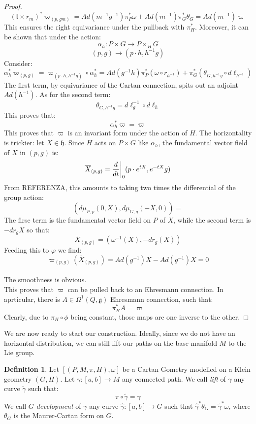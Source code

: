 \documentclass[12pt,a4paper]{report}
\theoremstyle{definition}
\newtheorem{Def}{Definition}[chapter]
\theoremstyle{Theorem}
\theoremstyle{definition}
\theoremstyle{definition}
\begin{document}
\begin{proof}
		$$(\mathbb{I}\times r_m)^*\varpi_{(p,gm)}=Ad(m^{-1}g^{-1})\pi_P^*\omega+Ad(m^{-1})\pi_G^*\theta_{G}=Ad(m^{-1})\varpi$$
		This ensures the right equivariance under the pullback with $\pi_H^*$. Moreover, it can be shown that under the action:
		$$\alpha_h:P\times G\rightarrow P\times_H G$$
		$$(p,g)\rightarrow (p\cdot h, h^{-1}g)$$
		Consider:
		$$\alpha_h^*\varpi_{(p,g)}=\varpi_{(p\cdot h,h^{-1}g)}\circ \alpha^*_h=Ad(g^{-1}h)\pi_P^*({\omega\circ r_{h^{-1}}})+\pi_G^*(\theta_{G,h^{-1}g}\circ d\ell_{h^{-1}})$$
		The first term, by equivariance of the Cartan connection, spits out an adjoint $Ad(h^{-1})$. As for the second term:
		$$\theta_{G,h^{-1}g}=d\ell_g^{-1}\circ d\ell_{h}$$
		This proves that:
		$$\alpha_h^*\varpi=\varpi$$
		This proves that $\varpi$ is an invariant form under the action of $H$. The horizontality is trickier: let $X\in \mathfrak{h}$. Since $H$ acts on $P\times G$ like $\alpha_h$, the fundamental vector field of $X$ in $(p,g)$ is:
		$$\overline{X}_{(p,g)}={d\over dt}\bigg|_0 (p\cdot e^{tX},e^{-tX}g)$$ From REFERENZA, this amounts to taking two times the differential of the group action:
		$$(d\mu_{P,p}(0,X),d\mu_{G,g}(-X,0))=$$
		The firse term is the fundamental vector field on $P$ of $X$, while the second term is $-dr_gX$ so that:
		$$\overline{X}_{(p,g)}=(\omega^{-1}(X),-dr_g(X))$$
		Feeding this to $\varphi$ we find:
		$$\varpi_{(p,g)}(\overline{X}_{(p,g)})=Ad(g^{-1})X-Ad(g^{-1})X=0$$
		\\
		The smoothness is obvious.\\ This proves that $\varpi$ can be pulled back to an Ehresmann connection. In aprticular, there is $A\in\Omega^1(Q,\mathfrak{g})$ Ehresmann connection, such that:
		$$\pi^*_HA=\varpi$$ 
		Clearly, due to $\pi_H\circ \phi$ being constant, those maps are one inverse to the other.
	\end{proof}
	We are now ready to start our construction. Ideally, since we do not have an horizontal distribution, we can still lift our paths on the base manifold $M$ to the Lie group. 
	\begin{Def}
		Let $[(P,M,\pi,H),\omega]$ be a Cartan Gometry modelled on a Klein geometry $(G,H)$. Let $\gamma:[a,b]\rightarrow M$ any connected path. We call \textit{lift} of $\gamma$ any curve $\tilde{\gamma}$ such that:
		$$\pi\circ\tilde{\gamma}=\gamma$$
		We call \textit{$G$-development} of $\gamma$ any curve $\hat{\gamma}:[a,b]\rightarrow G$ such that $\hat{\gamma}^*\theta_G=\tilde{\gamma}^*\omega$, where $\theta_G$ is the Maurer-Cartan form on $G$.
	\end{Def}
\end{document}
